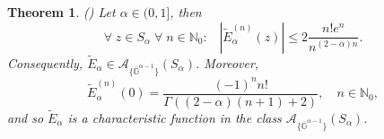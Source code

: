 \documentclass[11pt,a4paper]{article}
\theoremstyle{plain}
\newtheorem{theorem}[proposition]{Theorem}
\theoremstyle{definition}
\newcommand{\CC}{\mathbb{C}}
\newcommand{\NN}{\mathbb{N}}
\newcommand{\red}[1]{{\color{red}#1}}
\newcommand{\G}{\mathbb{G}}
\begin{document}
\begin{theorem}\label{Ealphathm} (\cite[Thm. 5, Thm. 20]{salinas62})
%		
Let $\alpha\in(0,1]$, then
		\begin{equation}\label{Ealphagoodestimate}
			\forall\;z\in S_{\alpha}\;\forall\;n\in\NN_0:\;\;\;\left|\widetilde{E}_{\alpha}^{(n)}(z)\right|\leq 2 \frac{n! e^n}{n^{(2-\alpha)n}}.
		\end{equation}
		Consequently, $\widetilde{E}_{\alpha}\in \mathcal{A}_{\{\overline{\G}^{\alpha-1}\}}(S_\alpha)$.
		Moreover,
{$$
\widetilde{E}_{\alpha}^{(n)}(0)=\frac{(-1)^n n!}{\Gamma ((2-\alpha)(n+1)+2)},\quad n\in\NN_0,
$$
and so} $\widetilde{E}_{\alpha}$ is a characteristic function in the class $\mathcal{A}_{\{\overline{\G}^{\alpha-1}\}}(S_\alpha)$.
\end{theorem}

%
%
%
%
\end{document}
